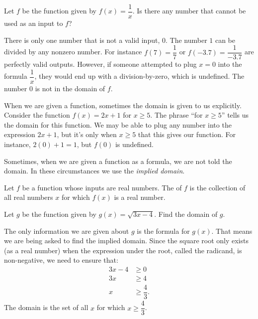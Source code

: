 \documentclass[nooutcomes]{ximera}
\begin{document}
	\begin{example}
		Let $f$ be the function given by $f(x) = \dfrac{1}{x}$. Is there any number that cannot be used as an input to $f$?
	
		\begin{explanation}
			There is only one number that is not a valid input, $0$. The number $1$ can be divided by any nonzero number. For instance $f(7) = \dfrac{1}{7}$ or $f(-3.7) = \dfrac{1}{-3.7}$ are perfectly valid outputs. However, if
			someone attempted to plug $x=0$ into the formula $\dfrac{1}{x}$, they would end up with a division-by-zero, which is undefined.  The number $0$ is not in the domain of $f$.
		\end{explanation}
	\end{example}
	
	
	When we are given a function, sometimes the domain is given to us explicitly. Consider the function $f(x) = 2x+1$ for $x \geq 5$. The phrase ``for $x \geq 5$'' tells us the domain for this function. We may be able to plug any 
	number into the expression $2x+1$, but it's only when $x \geq 5$ that this gives our function. For instance, $2(0)+1 = 1$, but $f(0)$ is undefined.
	
	Sometimes, when we are given a function as a formula, we are not told the domain. In these circumstances we use the \emph{implied domain}.
	\begin{definition}
		Let $f$ be a function whose inputs are real numbers. The  of $f$ is the collection of all real numbers $x$ for which $f(x)$ is a real number.
	\end{definition}

	\begin{example}
		Let $g$ be the function given by $g(x) = \sqrt{3x-4}$. Find the domain of $g$.
		
		\begin{explanation}
			The only information we are given about $g$ is the formula for $g(x)$. That means we are being asked to find the implied domain. Since the square root only exists (as a real number) when the expression under the root, called the radicand, is non-negative,
			we need to ensure that:
			\begin{align*} 
				3x-4 &\geq 0 \\
				3x & \geq 4\\
				x & \geq \dfrac{4}{3}.
			\end{align*}			
			The domain is the set of all $x$ for which $x \geq \dfrac{4}{3}$.
		\end{explanation}
	\end{example}
\end{document}
